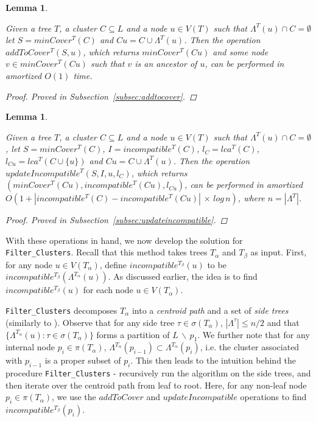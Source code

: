 \documentclass{article}
\newcommand{\leafset}{\Lambda}
\newcommand{\TA}{T_\alpha}
\newcommand{\TB}{T_\beta}
\newtheorem{mincoverruntime}[incompatibility]{Lemma}
\newtheorem{incompatibilityruntime}[incompatibility]{Lemma}
\begin{document}
    \begin{mincoverruntime}
        \label{lem:mincoverruntime}

        Given a tree $T$, a cluster $C \subseteq L$ and a node $u \in V(T)$ such that $\leafset^{T}(u) \cap C = \emptyset$ let $S = minCover^{T}(C)$ and $Cu = C \cup \leafset^{T}(u)$. Then the operation $addToCover^{T}(S, u)$, which returns $minCover^{T}(Cu)$ and some node $v \in minCover^{T}(Cu)$ such that $v$ is an ancestor of $u$, can be performed in amortized $O(1)$ time.

        \begin{proof}
            Proved in Subsection~\ref{subsec:addtocover}.
        \end{proof}
    \end{mincoverruntime}

    \medskip
    \begin{incompatibilityruntime}
        \label{lem:incompatibilityruntime}

        Given a tree $T$, a cluster $C \subseteq L$ and a node $u \in V(T)$ such that $\leafset^{T}(u) \cap C = \emptyset$, let $S = minCover^{T}(C)$, $I = incompatible^{T}(C)$, $l_C = lca^{T}(C)$, $l_{Cu} = lca^{T}(C \cup \{u\})$ and $Cu = C \cup \leafset^{T}(u)$. Then the operation $updateIncompatible^{T}(S, I, u, l_C)$, which returns $(minCover^{T}(Cu), incompatible^{T}(Cu), l_{Cu})$, can be performed in amortized $O(1 + |incompatible^{T}(C) - incompatible^{T}(Cu)|\,\times\,log\,n)$, where $n = |\leafset^{T}|$.

        \begin{proof}
            Proved in Subsection~\ref{subsec:updateincompatible}.
        \end{proof}
    \end{incompatibilityruntime}

    With these operations in hand, we now develop the solution for \texttt{Filter\_Clusters}. Recall that this method takes trees $\TA$ and $\TB$ as input. First, for any node $u \in V(\TA)$, define $incompatible^{\TB}(u)$ to be $incompatible^{\TB}(\leafset^{\TA}(u))$. As discussed earlier, the idea is to find $incompatible^{\TB}(u)$ for each node $u \in V(\TA)$.

    \texttt{Filter\_Clusters} decomposes $\TA$ into a \textit{centroid path} and a set of \textit{side trees} (similarly to \cite{jansson2018algorithms}). Observe that for any side tree $\tau \in \sigma(\TA)$, $|\leafset^\tau| \leq n/2$ and that $\{\leafset^{\TA}(u) : \tau \in \sigma(\TA)\}$ forms a partition of $L\, \backslash\, {p_1}$. We further note that for any internal node $p_i \in \pi(\TA)$, $\leafset^{\TA}(p_{i - 1}) \subset \leafset^{\TA}(p_i)$, i.e. the cluster associated with $p_{i-1}$ is a proper subset of $p_i$. This then leads to the intuition behind the procedure \texttt{Filter\_Clusters} - recursively run the algorithm on the side trees, and then iterate over the centroid path from leaf to root. Here, for any non-leaf node $p_i \in \pi(\TA)$, we use
    the $addToCover$ and $updateIncompatible$ operations to find $incompatible^{\TB}(p_i)$.
\end{document}
